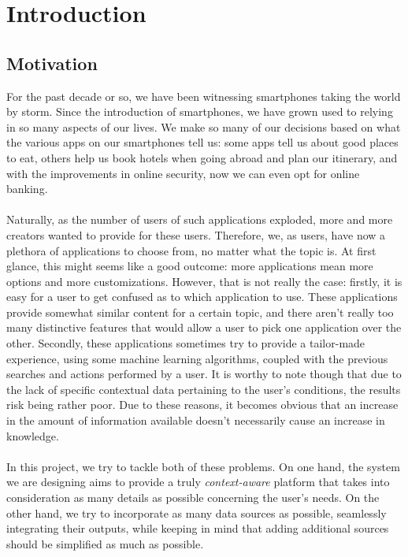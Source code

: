 \chapter{Introduction}
\label{Introduction}
\thispagestyle{empty}
\section{Motivation}
For the past decade or so, we have been witnessing smartphones taking the world by storm. Since the introduction of smartphones, we have grown used to relying in so many aspects of our lives. We make so many of our decisions based on what the various apps on our smartphones tell us: some apps tell us about good places to eat, others help us book hotels when going abroad and plan our itinerary, and with the improvements in online security, now we can even opt for online banking.\\\\
Naturally, as the number of users of such applications exploded, more and more creators wanted to provide for these users. Therefore, we, as users, have now a plethora of applications to choose from, no matter what the topic is. At first glance, this might seems like a good outcome: more applications mean more options and more customizations. However, that is not really the case: firstly, it is easy for a user to get confused as to which application to use. These applications provide somewhat similar content for a certain topic, and there aren't really too many distinctive features that would allow a user to pick one application over the other. Secondly, these applications sometimes try to provide a tailor-made experience, using some machine learning algorithms, coupled with the previous searches and actions performed by a user. It is worthy to note though that due to the lack of specific contextual data pertaining to the user's conditions, the results risk being rather poor. Due to these reasons, it becomes obvious that an increase in the amount of information available doesn't necessarily cause an increase in knowledge.\\\\
In this project, we try to tackle both of these problems. On one hand, the system we are designing aims to provide a truly \emph{context-aware} platform that takes into consideration as many details as possible concerning the user's needs. On the other hand, we try to incorporate as many data sources as possible, seamlessly integrating their outputs, while keeping in mind that adding additional sources should be simplified as much as possible.\\\\

